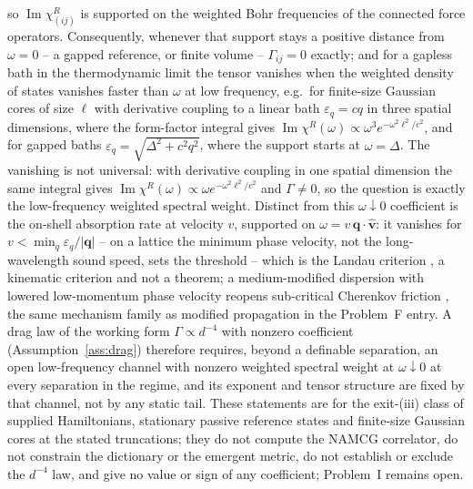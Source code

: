 so \(\operatorname{Im}\chi^R_{(ij)}\) is supported on the weighted Bohr frequencies of the connected force operators. Consequently, whenever that support stays a positive distance from \(\omega=0\) -- a gapped reference, or finite volume -- \(\Gamma_{ij}=0\) exactly; and for a gapless bath in the thermodynamic limit the tensor vanishes when the weighted density of states vanishes faster than \(\omega\) at low frequency, e.g.\ for finite-size Gaussian cores of size \(\ell\) with derivative coupling to a linear bath \(\varepsilon_q=cq\) in three spatial dimensions, where the form-factor integral gives \(\operatorname{Im}\chi^R(\omega)\propto\omega^3 e^{-\omega^2\ell^2/c^2}\), and for gapped baths \(\varepsilon_q=\sqrt{\Delta^2+c^2q^2}\), where the support starts at \(\omega=\Delta\). The vanishing is not universal: with derivative coupling in one spatial dimension the same integral gives \(\operatorname{Im}\chi^R(\omega)\propto\omega e^{-\omega^2\ell^2/c^2}\) and \(\Gamma\neq0\), so the question is exactly the low-frequency weighted spectral weight. Distinct from this \(\omega\downarrow0\) coefficient is the on-shell absorption rate at velocity \(v\), supported on \(\omega=v\,\mathbf q\cdot\hat{\mathbf v}\): it vanishes for \(v<\min_q\varepsilon_q/|\mathbf q|\) -- on a lattice the minimum phase velocity, not the long-wavelength sound speed, sets the threshold -- which is the Landau criterion \cite{Landau1941}, a kinematic criterion and not a theorem; a medium-modified dispersion with lowered low-momentum phase velocity reopens sub-critical Cherenkov friction \cite{BerezhianiElderKhoury2019}, the same mechanism family as modified propagation in the Problem~F entry. A drag law of the working form \(\Gamma\propto d^{-4}\) with nonzero coefficient (Assumption~\ref{ass:drag}) therefore requires, beyond a definable separation, an open low-frequency channel with nonzero weighted spectral weight at \(\omega\downarrow0\) at every separation in the regime, and its exponent and tensor structure are fixed by that channel, not by any static tail. These statements are for the exit-(iii) class of supplied Hamiltonians, stationary passive reference states and finite-size Gaussian cores at the stated truncations; they do not compute the NAMCG correlator, do not constrain the dictionary or the emergent metric, do not establish or exclude the \(d^{-4}\) law, and give no value or sign of any coefficient; Problem~I remains open.
